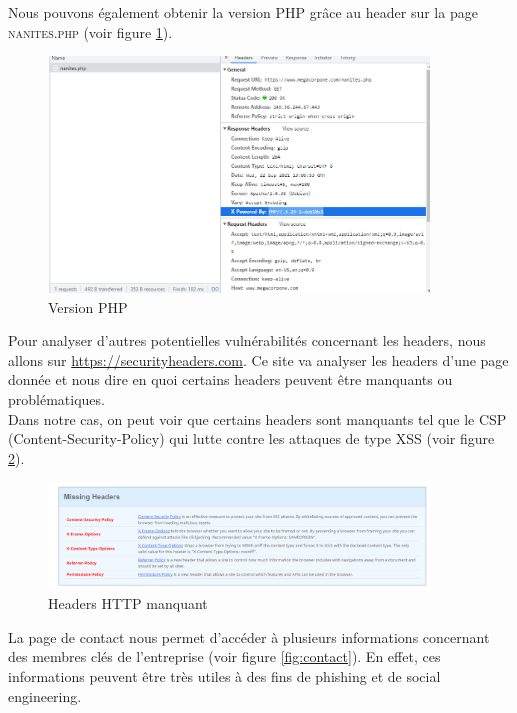 \documentclass[a4paper]{article}
\begin{document}
Nous pouvons également obtenir la version PHP grâce au header sur la page \textsc{nanites.php} (voir figure \ref{fig:versionphp}).

\begin{figure}[H]
    \centering
    \includegraphics[width=0.90\textwidth]{images/lab1/versionphp.PNG}
    \caption{Version PHP}
    \label{fig:versionphp}
\end{figure}
 
Pour analyser d'autres potentielles vulnérabilités concernant les headers, nous allons sur \url{https://securityheaders.com}. Ce site va analyser les headers d'une page donnée et nous dire en quoi certains headers peuvent être manquants ou problématiques.\\
Dans notre cas, on peut voir que certains headers sont manquants tel que le CSP (Content-Security-Policy) qui lutte contre les attaques de type XSS (voir figure \ref{fig:missingheaders}).

\begin{figure}[H]
    \centering
    \includegraphics[width=0.90\textwidth]{images/lab1/missingheaders.PNG}
    \caption{Headers HTTP manquant}
    \label{fig:missingheaders}
\end{figure}

La page de contact nous permet d'accéder à plusieurs informations concernant des membres clés de l'entreprise (voir figure \ref{fig:contact}). En effet, ces informations peuvent être très utiles à des fins de phishing et de social engineering. 
\end{document}
